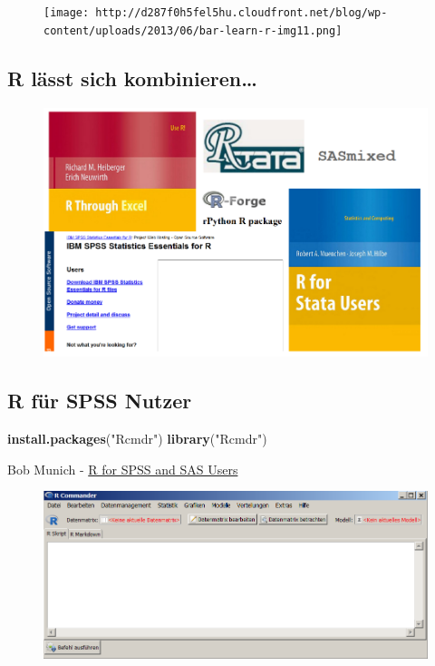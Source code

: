 \documentclass[]{article}
\newenvironment{Shaded}{\begin{snugshade}}{\end{snugshade}}
\newcommand{\KeywordTok}[1]{\textcolor[rgb]{0.13,0.29,0.53}{\textbf{{#1}}}}
\newcommand{\StringTok}[1]{\textcolor[rgb]{0.31,0.60,0.02}{{#1}}}
\newcommand{\NormalTok}[1]{{#1}}
\begin{document}
\begin{figure}[htbp]
\centering
\texttt{[image: http://d287f0h5fel5hu.cloudfront.net/blog/wp-content/uploads/2013/06/bar-learn-r-img11.png]}
\caption{}
\end{figure}

\subsection{R lässt sich
kombinieren\ldots{}}\label{r-lasst-sich-kombinieren}

\begin{figure}[htbp]
\centering
\includegraphics{figure/Rinterfaces.PNG}
\caption{}
\end{figure}

\subsection{R für SPSS Nutzer}\label{r-fur-spss-nutzer}

\begin{Shaded}
\begin{Highlighting}[]
\KeywordTok{install.packages}\NormalTok{(}\StringTok{"Rcmdr"}\NormalTok{)}
\KeywordTok{library}\NormalTok{(}\StringTok{"Rcmdr"}\NormalTok{)}
\end{Highlighting}
\end{Shaded}

Bob Munich -
\href{https://science.nature.nps.gov/im/datamgmt/statistics/r/documents/r_for_sas_spss_users.pdf}{R
for SPSS and SAS Users}

\begin{figure}[htbp]
\centering
\includegraphics{figure/Rcommanderex.PNG}
\caption{}
\end{figure}
\end{document}
